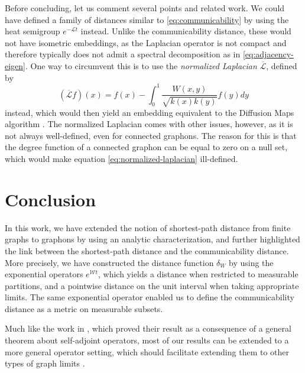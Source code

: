 \documentclass[11pt]{article}
\def\calW{\mathcal{W}}
\def\calL{\mathcal{L}}
\theoremstyle{definition}
\begin{document}
Before concluding, let us comment several points and related work. We could have defined a family of distances similar to \eqref{eq:communicability} by using the heat semigroup $e^{-\calL t}$ instead. Unlike the communicability distance, these would not have isometric embeddings, as the Laplacian operator is not compact and therefore typically does not admit a spectral decomposition as in \eqref{eq:adjacency-eigen}. One way to circumvent this is to use the \textit{normalized Laplacian} $\overline{\calL}$, defined by 
\begin{equation} \label{eq:normalized-laplacian} 
    (\overline{\calL} f)(x) = f(x) - \int_0^1 \frac{W(x,y)}{\sqrt{k(x) k(y)}} f(y) dy
\end{equation}
instead, which would then yield an embedding equivalent to the Diffusion Maps algorithm \cite{coifmanDiffusionMaps2006}. The normalized Laplacian comes with other issues, however, as it is not always well-defined, even for connected graphons. The reason for this is that the degree function of a connected graphon can be equal to zero on a null set, which would make equation \eqref{eq:normalized-laplacian} ill-defined.

\section{Conclusion}

In this work, we have extended the notion of shortest-path distance from finite graphs to graphons by using an analytic characterization, and further highlighted the link between the shortest-path distance and the communicability distance. More precisely, we have constructed the distance function $\delta_W$ by using the exponential operators $e^{\calW t}$, which yields a distance when restricted to measurable partitions, and a pointwise distance on the unit interval when taking appropriate limits. The same exponential operator enabled us to define the communicability distance as a metric on measurable subsets.

Much like the work in \cite{kellerNoteShorttimeBehavior2016}, which proved their result as a consequence of a general theorem about self-adjoint operators, most of our results can be extended to a more general operator setting, which should facilitate extending them to other types of graph limits \cite{backhauszActionConvergenceOperators2022,borgsLpTheorySparse2019}.
\end{document}
